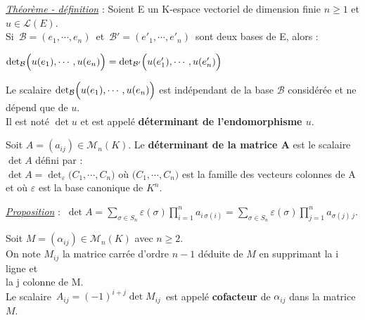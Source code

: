 \vspace{1.5cm}

\underline{\emph{Théorème - définition}} : Soient E un K-espace vectoriel de dimension finie \(n\geq 1\) et \(u\in \mathscr{L}(E)\).\vspace{0.05cm} \\
Si \(\,\mathcal{B}=(e_1,\cdots,e_n)\,\) et \(\,\mathcal{B}'=(e'_1,\cdots,e'_n)\,\) sont deux bases de E, alors : \vspace{-0.2cm}
\begin{center}
    \(\det_\mathcal{B}\Bigl(u(e_1),\cdots,u(e_n)\Bigr)=\det_{\mathcal{B}'}\Bigl(u(e'_1),\cdots,u(e'_n)\Bigr) \)
\end{center}\vspace{-0.2cm}
Le scalaire \(\det_\mathcal{B}\Bigl(u(e_1),\cdots,u(e_n)\Bigr)\) est indépendant de la base \(\mathcal{B}\) considérée et ne dépend que de \(u\).\\
Il est noté \(\det u\) et est appelé \textbf{déterminant de l'endomorphisme \(u\)}. 

\vspace{1.3cm}

Soit \(A=(a_{ij})\in \mathcal{M}_n(K).\) Le \textbf{déterminant de la matrice A} est le scalaire \(\det A\) défini par :\\
\(\det A = \det_\varepsilon\bigl(C_1,\cdots,C_n\bigr) \) où \(\bigl(C_1,\cdots,C_n\bigr)\) est la famille des vecteurs colonnes de A et où \(\varepsilon\) est la base canonique de \(K^n\).

\emph{\underline{Proposition}} : \(\displaystyle\ \det A = \sum_{\sigma \in S_n}\varepsilon(\sigma)\prod_{i=1}^{n}a_{i\,\sigma(i)}=\sum_{\sigma \in S_n}\varepsilon(\sigma)\prod_{j=1}^{n}a_{\sigma(j)\,j}.\)

\vspace{1cm}

Soit \(M=(\alpha_{ij})\in\mathcal{M}_n(K)\) avec \(n\geq 2\).\\
On note \(M_{ij} \) la matrice carrée d'ordre \(n-1\) déduite de \(M\) en supprimant la i ligne et\\
la j colonne de M.\\
Le scalaire \(\,A_{ij}=(-1)^{i+j}\det M_{ij}\, \) est appelé \textbf{cofacteur} de \(\alpha_{ij} \) dans la matrice \(M\).\vspace{0.5cm}

